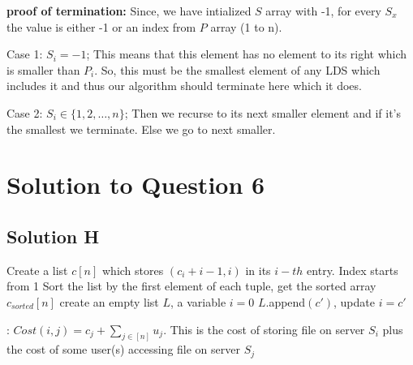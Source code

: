 \documentclass[11pt]{article}
\begin{document}
{\bf proof of termination:}
Since, we have intialized $S$ array with -1, for every $S_x$ the value is either -1 or an index from $P$ array (1 to n).

Case 1: $S_i = -1$; This means that this element has no element to its right which is smaller than $P_i$. 
So, this must be the smallest element of any LDS which includes it and  thus our algorithm should terminate here which it does.

Case 2: $S_i \in \{1,2, \dots, n\}$; Then we recurse to  its next smaller element and if it's the smallest we terminate. Else we go to next smaller.

\section{Solution to Question 6}

\subsection{Solution H}


\begin{algorithm}
\begin{algorithmic}
  \State Create a list $c[n]$ which stores $(c_i+i-1, i)$ in its $i-th$ entry. Index starts from 1
  \State Sort the list by the first element of each tuple, get the sorted array $c_{sorted}[n]$
  \State create an empty list $L$, a variable $i = 0$
      \State $L$.append$(c')$, update $i = c'$ 
    \EndIf
  \EndFor
\end{algorithmic}
\end{algorithm}

: {\it $Cost(i, j) = c_j + \sum_{j \in [n]} u_j$}. This is the cost of storing file on server $S_i$ plus the cost of some user(s) accessing file on server $S_j$
\end{document}
